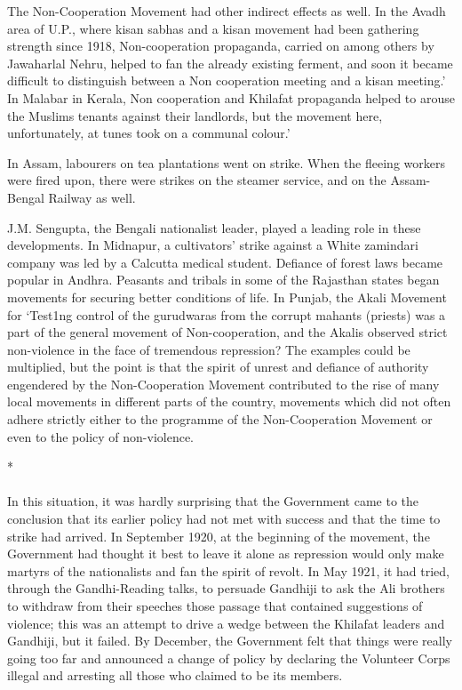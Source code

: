The Non-Cooperation Movement had other indirect effects as well. In the Avadh area of U.P., where kisan sabhas and a kisan movement had been gathering strength since 1918, Non-cooperation propaganda, carried on among others by Jawaharlal Nehru, helped to fan the already existing ferment, and soon it became difficult to distinguish between a Non cooperation meeting and a kisan meeting.' In Malabar in Kerala, Non cooperation and Khilafat propaganda helped to arouse the Muslims tenants against their landlords, but the movement here, unfortunately, at tunes took on a communal colour.' 

In Assam, labourers on tea plantations went on strike. When the fleeing workers were fired upon, there were strikes on the steamer service, and on the Assam-Bengal Railway as well. 

J.M. Sengupta, the Bengali nationalist leader, played a leading role in these developments. In Midnapur, a cultivators' strike against a White zamindari company was led by a Calcutta medical student. Defiance of forest laws became popular in Andhra. Peasants and tribals in some of the Rajasthan states began movements for securing better conditions of life. In Punjab, the Akali Movement for `Test1ng control of the gurudwaras from the corrupt mahants (priests) was a part of the general movement of Non-cooperation, and the Akalis observed strict non-violence in the face of tremendous repression? The examples could be multiplied, but the point is that the spirit of unrest and defiance of authority engendered by the Non-Cooperation Movement contributed to the rise of many local movements in different parts of the country, movements which did not often adhere strictly either to the programme of the Non-Cooperation Movement or even to the policy of non-violence.

\begin{center}*\end{center}

\paragraph*{}


In this situation, it was hardly surprising that the Government came to the conclusion that its earlier policy had not met with success and that the time to strike had arrived. In September 1920, at the beginning of the movement, the Government had thought it best to leave it alone as repression would only make martyrs of the nationalists and fan the spirit of revolt. In May 1921, it had tried, through the Gandhi-Reading talks, to persuade Gandhiji to ask the Ali brothers to withdraw from their speeches those passage that contained suggestions of violence; this was an attempt to drive a wedge between the Khilafat leaders and Gandhiji, but it failed. By December, the Government felt that things were really going too far and announced a change of policy by declaring the Volunteer Corps illegal and arresting all those who claimed to be its members. 

